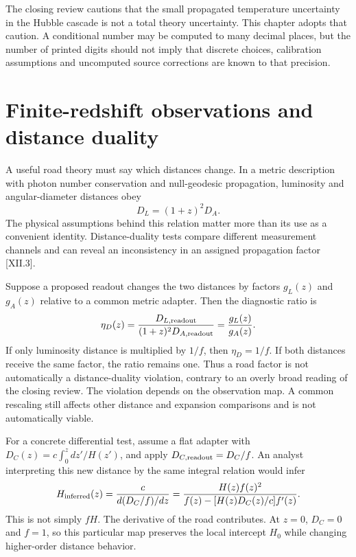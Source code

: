 The closing review cautions that the small propagated temperature uncertainty in the Hubble cascade is not a total theory uncertainty. This chapter adopts that caution. A conditional number may be computed to many decimal places, but the number of printed digits should not imply that discrete choices, calibration assumptions and uncomputed source corrections are known to that precision.

\section{Finite-redshift observations and distance duality}
A useful road theory must say which distances change. In a metric description with photon number conservation and null-geodesic propagation, luminosity and angular-diameter distances obey
\begin{equation}
 D_L=(1+z)^2D_A.
 \label{c12:duality}
\end{equation}
The physical assumptions behind this relation matter more than its use as a convenient identity. Distance-duality tests compare different measurement channels and can reveal an inconsistency in an assigned propagation factor [XII.3].

Suppose a proposed readout changes the two distances by factors $g_L(z)$ and $g_A(z)$ relative to a common metric adapter. Then the diagnostic ratio is
\begin{equation}
 \eta_D(z)=\frac{D_{L,\rm readout}}{(1+z)^2D_{A,\rm readout}}
          =\frac{g_L(z)}{g_A(z)}.
 \label{c12:dualityratio}
\end{equation}
If only luminosity distance is multiplied by $1/f$, then $\eta_D=1/f$. If both distances receive the same factor, the ratio remains one. Thus a road factor is not automatically a distance-duality violation, contrary to an overly broad reading of the closing review. The violation depends on the observation map. A common rescaling still affects other distance and expansion comparisons and is not automatically viable.

For a concrete differential test, assume a flat adapter with $D_C(z)=c\int_0^z dz'/H(z')$, and apply $D_{C,\rm readout}=D_C/f$. An analyst interpreting this new distance by the same integral relation would infer
\begin{equation}
 H_{\rm inferred}(z)
 =\frac{c}{d(D_C/f)/dz}
 =\frac{H(z)f(z)^2}
 {f(z)-[H(z)D_C(z)/c]f'(z)}.
 \label{c12:inferredH}
\end{equation}
This is not simply $fH$. The derivative of the road contributes. At $z=0$, $D_C=0$ and $f=1$, so this particular map preserves the local intercept $H_0$ while changing higher-order distance behavior.

